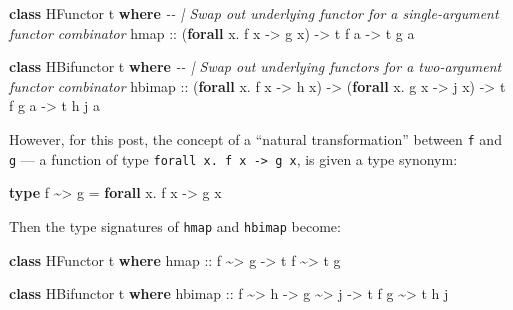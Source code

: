 \documentclass[]{article}
\newenvironment{Shaded}{}{}
\newcommand{\CommentTok}[1]{\textcolor[rgb]{0.38,0.63,0.69}{\textit{#1}}}
\newcommand{\DataTypeTok}[1]{\textcolor[rgb]{0.56,0.13,0.00}{#1}}
\newcommand{\KeywordTok}[1]{\textcolor[rgb]{0.00,0.44,0.13}{\textbf{#1}}}
\newcommand{\NormalTok}[1]{#1}
\newcommand{\OperatorTok}[1]{\textcolor[rgb]{0.40,0.40,0.40}{#1}}
\newcommand{\OtherTok}[1]{\textcolor[rgb]{0.00,0.44,0.13}{#1}}
\begin{document}
\begin{Shaded}
\begin{Highlighting}[]
\KeywordTok{class} \DataTypeTok{HFunctor}\NormalTok{ t }\KeywordTok{where}
    \CommentTok{{-}{-} | Swap out underlying functor for a single{-}argument functor combinator}
\NormalTok{    hmap}
\OtherTok{        ::}\NormalTok{ (}\KeywordTok{forall}\NormalTok{ x}\OperatorTok{.}\NormalTok{ f x }\OtherTok{{-}\textgreater{}}\NormalTok{ g x)}
        \OtherTok{{-}\textgreater{}}\NormalTok{ t f a}
        \OtherTok{{-}\textgreater{}}\NormalTok{ t g a}

\KeywordTok{class} \DataTypeTok{HBifunctor}\NormalTok{ t }\KeywordTok{where}
    \CommentTok{{-}{-} | Swap out underlying functors for a two{-}argument functor combinator}
\NormalTok{    hbimap}
\OtherTok{        ::}\NormalTok{ (}\KeywordTok{forall}\NormalTok{ x}\OperatorTok{.}\NormalTok{ f x }\OtherTok{{-}\textgreater{}}\NormalTok{ h x)}
        \OtherTok{{-}\textgreater{}}\NormalTok{ (}\KeywordTok{forall}\NormalTok{ x}\OperatorTok{.}\NormalTok{ g x }\OtherTok{{-}\textgreater{}}\NormalTok{ j x)}
        \OtherTok{{-}\textgreater{}}\NormalTok{ t f g a}
        \OtherTok{{-}\textgreater{}}\NormalTok{ t h j a}
\end{Highlighting}
\end{Shaded}

However, for this post, the concept of a ``natural transformation'' between
\texttt{f} and \texttt{g} --- a function of type
\texttt{forall\ x.\ f\ x\ -\textgreater{}\ g\ x}, is given a type synonym:

\begin{Shaded}
\begin{Highlighting}[]
\KeywordTok{type}\NormalTok{ f }\OperatorTok{\textasciitilde{}\textgreater{}}\NormalTok{ g }\OtherTok{=} \KeywordTok{forall}\NormalTok{ x}\OperatorTok{.}\NormalTok{ f x }\OtherTok{{-}\textgreater{}}\NormalTok{ g x}
\end{Highlighting}
\end{Shaded}

Then the type signatures of \texttt{hmap} and \texttt{hbimap} become:

\begin{Shaded}
\begin{Highlighting}[]
\KeywordTok{class} \DataTypeTok{HFunctor}\NormalTok{ t }\KeywordTok{where}
\NormalTok{    hmap}
\OtherTok{        ::}\NormalTok{ f }\OperatorTok{\textasciitilde{}\textgreater{}}\NormalTok{ g}
        \OtherTok{{-}\textgreater{}}\NormalTok{ t f }\OperatorTok{\textasciitilde{}\textgreater{}}\NormalTok{ t g}

\KeywordTok{class} \DataTypeTok{HBifunctor}\NormalTok{ t }\KeywordTok{where}
\NormalTok{    hbimap}
\OtherTok{        ::}\NormalTok{ f }\OperatorTok{\textasciitilde{}\textgreater{}}\NormalTok{ h}
        \OtherTok{{-}\textgreater{}}\NormalTok{ g }\OperatorTok{\textasciitilde{}\textgreater{}}\NormalTok{ j}
        \OtherTok{{-}\textgreater{}}\NormalTok{ t f g }\OperatorTok{\textasciitilde{}\textgreater{}}\NormalTok{ t h j}
\end{Highlighting}
\end{Shaded}
\end{document}
